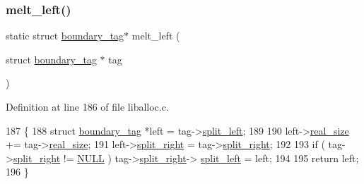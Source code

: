 \mbox{\label{a00035_a7ea762780416b837601691f20e085cc2_a7ea762780416b837601691f20e085cc2}} 
\subsubsection{\texorpdfstring{melt\+\_\+left()}{melt\_left()}}
{\footnotesize\ttfamily static struct \hyperlink{a00126}{boundary\+\_\+tag}$\ast$ melt\+\_\+left (\begin{DoxyParamCaption}\item[{struct \hyperlink{a00126}{boundary\+\_\+tag} $\ast$}]{tag }\end{DoxyParamCaption})\hspace{0.3cm}{\ttfamily [static]}}



Definition at line 186 of file liballoc.\+c.


\begin{DoxyCode}
187 \{
188     \textcolor{keyword}{struct }\hyperlink{a00126}{boundary\_tag} *left = tag->\hyperlink{a00126_a4daa8c3768359ea8d0f46ef907616cc2_a4daa8c3768359ea8d0f46ef907616cc2}{split\_left};
189                             
190     left->\hyperlink{a00126_ad22b1c69bdce419783ac165f7f354245_ad22b1c69bdce419783ac165f7f354245}{real\_size}   += tag->\hyperlink{a00126_ad22b1c69bdce419783ac165f7f354245_ad22b1c69bdce419783ac165f7f354245}{real\_size};
191     left->\hyperlink{a00126_a9d43c9c4ff5ae35908dcfed0aec1907a_a9d43c9c4ff5ae35908dcfed0aec1907a}{split\_right}  = tag->\hyperlink{a00126_a9d43c9c4ff5ae35908dcfed0aec1907a_a9d43c9c4ff5ae35908dcfed0aec1907a}{split\_right};
192     
193     \textcolor{keywordflow}{if} ( tag->\hyperlink{a00126_a9d43c9c4ff5ae35908dcfed0aec1907a_a9d43c9c4ff5ae35908dcfed0aec1907a}{split\_right} != \hyperlink{a00038_a070d2ce7b6bb7e5c05602aa8c308d0c4_a070d2ce7b6bb7e5c05602aa8c308d0c4}{NULL} ) tag->\hyperlink{a00126_a9d43c9c4ff5ae35908dcfed0aec1907a_a9d43c9c4ff5ae35908dcfed0aec1907a}{split\_right}->
      \hyperlink{a00126_a4daa8c3768359ea8d0f46ef907616cc2_a4daa8c3768359ea8d0f46ef907616cc2}{split\_left} = left;
194 
195     \textcolor{keywordflow}{return} left;
196 \}
\end{DoxyCode}
\mbox{\label{a00035_ac5f241a082afc3c26df1eb7dfdd8d8e0_ac5f241a082afc3c26df1eb7dfdd8d8e0}} 
